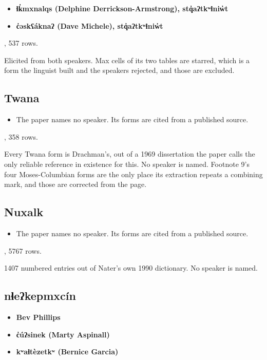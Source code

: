 \begin{itemize}
\item \textbf{ɬk̓mxnalqs (Delphine Derrickson-Armstrong), stq̓aʔtkʷɬniw̓t}
\item \textbf{c̓əskʕáknaʔ (Dave Michele), stq̓aʔtkʷɬniw̓t}
\end{itemize}

\cite{src:Lyon-2025}, 537 rows.

Elicited from both speakers. Max cells of its two tables are starred, which is a form the linguist built and the speakers rejected, and those are excluded.

\subsection{Twana}

\begin{itemize}
\item The paper names no speaker. Its forms are cited from a published source.
\end{itemize}

\cite{src:Kim-2017}, 358 rows.

Every Twana form is Drachman's, out of a 1969 dissertation the paper calls the only reliable reference in existence for this. No speaker is named. Footnote 9's four Moses-Columbian forms are the only place its extraction repeats a combining mark, and those are corrected from the page.

\subsection{Nuxalk}

\begin{itemize}
\item The paper names no speaker. Its forms are cited from a published source.
\end{itemize}

\cite{src:Nater-2013}, 5767 rows.

1407 numbered entries out of Nater's own 1990 dictionary. No speaker is named.

\subsection{nɬeʔkepmxcín}

\begin{itemize}
\item \textbf{Bev Phillips}
\item \textbf{c̓úʔsinek (Marty Aspinall)}
\item \textbf{kʷaɬtèzetkʷ (Bernice Garcia)}
\end{itemize}

